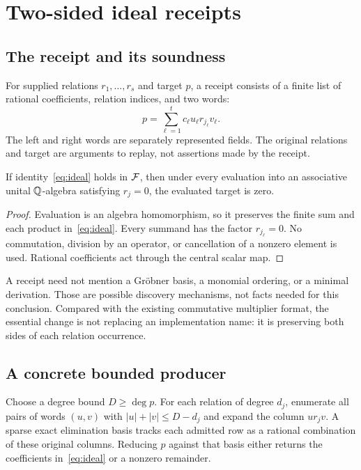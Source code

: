 \section{Two-sided ideal receipts}
\label{sec:ideal}

\subsection{The receipt and its soundness}

For supplied relations $r_1,\ldots,r_s$ and target $p$, a receipt consists of a
finite list of rational coefficients, relation indices, and two words:
\begin{equation}\label{eq:ideal}
 p=\sum_{\ell=1}^{t} c_\ell u_\ell r_{j_\ell}v_\ell.
\end{equation}
The left and right words are separately represented fields. The original
relations and target are arguments to replay, not assertions made by the receipt.

\begin{theorem}\label{thm:ideal-sound}
If identity~\eqref{eq:ideal} holds in $\mathcal F$, then under every evaluation into an
associative unital $\mathbb Q$-algebra satisfying $r_j=0$, the evaluated target is zero.
\end{theorem}
\begin{proof}
Evaluation is an algebra homomorphism, so it preserves the finite sum and each
product in~\eqref{eq:ideal}. Every summand has the factor $r_{j_\ell}=0$.
No commutation, division by an operator, or cancellation of a nonzero element is
used. Rational coefficients act through the central scalar map.
\end{proof}

A receipt need not mention a Gr\"obner basis, a monomial ordering, or a minimal
derivation. Those are possible discovery mechanisms, not facts needed for this
conclusion. Compared with the existing commutative multiplier format, the
essential change is not replacing an implementation name: it is preserving both
sides of each relation occurrence.

\subsection{A concrete bounded producer}

Choose a degree bound $D\ge\deg p$. For each relation of degree $d_j$, enumerate
all pairs of words $(u,v)$ with $|u|+|v|\le D-d_j$ and expand the column
$u r_jv$. A sparse exact elimination basis tracks each admitted row as a rational
combination of these original columns. Reducing $p$ against that basis either
returns the coefficients in~\eqref{eq:ideal} or a nonzero remainder.

